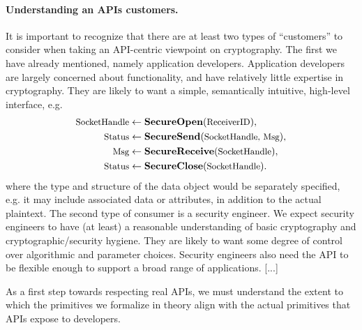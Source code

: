 \paragraph{Understanding an APIs customers. }
It is important to recognize that there are at least two types of ``customers'' to consider 
when taking an API-centric viewpoint on cryptography.   The first we have already mentioned, 
namely application developers.  Application developers are largely concerned about functionality,
and have relatively little expertise in cryptography.  They are likely to want a simple,
semantically intuitive, high-level interface, e.g. 
\begin{align*}
\textrm{\small SocketHandle}&\gets\textsf{\bf SecureOpen}(\textrm{\small ReceiverID}), \\
\textrm{\small Status}&\gets\textsf{\bf SecureSend}(\textrm{\small SocketHandle, Msg}),\\
\textrm{\small Msg}&\gets\textsf{\bf SecureReceive}(\textrm{\small SocketHandle}), \\
\textrm{\small Status}&\gets\textsf{\bf SecureClose}(\textrm{\small SocketHandle}).
\end{align*}
%
where the type and structure of the data object  would be separately specified, e.g. it may 
include associated data or attributes, in addition to the actual plaintext.
%
The second type of consumer is a security engineer.  We expect security engineers to have (at least)
a reasonable understanding of basic cryptography and cryptographic/security hygiene.  They are
likely to want some degree of control over algorithmic and parameter choices.  Security engineers also
need the API to be flexible enough to support a broad range of applications.   [...]


\begin{task}
 As a first step towards respecting real APIs, we must understand the extent to
which the primitives we formalize in theory align with the actual primitives
that APIs expose to developers. 
\end{task}




